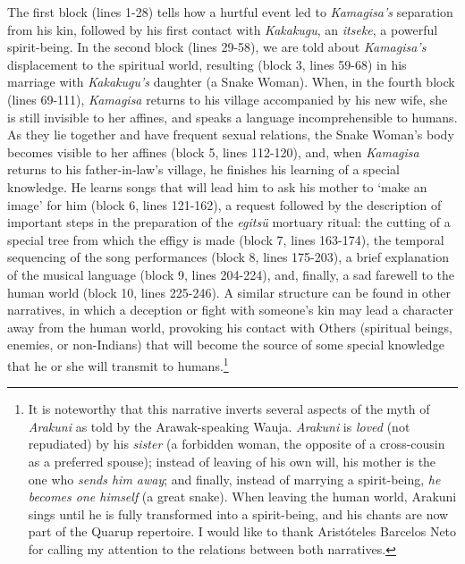 \documentclass[output=paper,
modfonts,nonflat
]{langsci/langscibook}
\begin{document}
    The first block (lines 1-28) tells how a hurtful event led to \textit{Kamagisa's} separation from his kin, followed by his first contact with \textit{Kakakugu}, an \textit{itseke}, a powerful spirit-being. In the second block (lines 29-58), we are told about \textit{Kamagisa's} displacement to the spiritual world, resulting (block 3, lines 59-68) in his marriage with \textit{Kakakugu's} daughter (a Snake Woman). When, in the fourth block (lines 69-111), \textit{Kamagisa} returns to his village accompanied by his new wife, she is still invisible to her affines, and speaks a language incomprehensible to humans. As they lie together and have frequent sexual relations, the Snake Woman's body becomes visible to her affines (block 5, lines 112-120), and, when \textit{Kamagisa} returns to his father-in-law's village, he finishes his learning of a special knowledge. He learns songs that will lead him to ask his mother to ‘make an image' for him (block 6, lines 121-162), a request followed by the description of important steps in the preparation of the \textit{egitsü} mortuary ritual: the cutting of a special tree from which the effigy is made (block 7, lines 163-174), the temporal sequencing of the song performances (block 8, lines 175-203), a brief explanation of the musical language (block 9, lines 204-224), and, finally, a sad farewell to the human world (block 10, lines 225-246). A similar structure can be found in other narratives, in which a deception or fight with someone's kin may lead a character away from the human world, provoking his contact with Others (spiritual beings, enemies, or non-Indians) that will become the source of some special knowledge that he or she will transmit to humans.\footnote{It is noteworthy that this narrative inverts several aspects of the myth of \textit{Arakuni} as told by the Arawak-speaking Wauja. \textit{Arakuni} is \textit{loved} (not repudiated) by his \textit{sister} (a forbidden woman, the opposite of a cross-cousin as a preferred spouse); instead of leaving of his own will, his mother is the one who \textit{sends him away}; and finally, instead of marrying a spirit-being, \textit{he becomes one himself} (a great snake). When leaving the human world, Arakuni sings until he is fully transformed into a spirit-being, and his chants are now part of the Quarup repertoire. I would like to thank Aristóteles Barcelos Neto for calling my attention to the relations between both narratives.}
    
\end{document}
